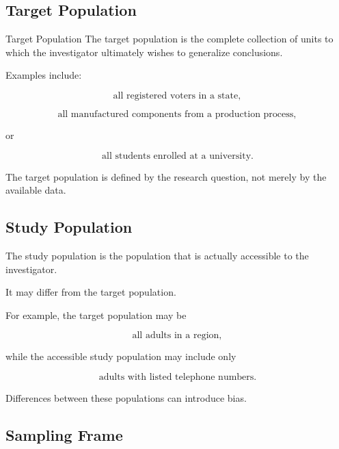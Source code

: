 \subsection{Target Population}
\label{subsec:target-population}

\begin{definitionbox}{Target Population}
The target population is the complete collection of units to which the
investigator ultimately wishes to generalize conclusions.
\end{definitionbox}

Examples include:

\[
\text{all registered voters in a state},
\]

\[
\text{all manufactured components from a production process},
\]

or

\[
\text{all students enrolled at a university}.
\]

The target population is defined by the research question, not merely by
the available data.

\subsection{Study Population}
\label{subsec:study-population}

The study population is the population that is actually accessible to
the investigator.

It may differ from the target population.

For example, the target population may be

\[
\text{all adults in a region},
\]

while the accessible study population may include only

\[
\text{adults with listed telephone numbers}.
\]

Differences between these populations can introduce bias.

\subsection{Sampling Frame}
\label{subsec:sampling-frame}


